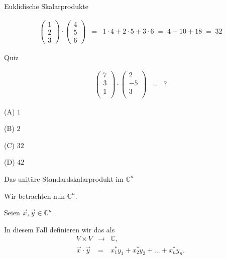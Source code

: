 \documentclass[german]{beamer}
\newcommand{\superalert}[1]{{\color{MyYellowOrange}{#1}}}
\newcommand{\bq}{\begin{eqnarray*}}
\newcommand{\eq}{\end{eqnarray*}}
\begin{document}
\begin{frame}{Euklidische Skalarprodukte}

\begin{example}
\bq
 \left( \begin{array}{c} 1 \\ 2 \\ 3 \end{array} \right)
 \cdot
 \left( \begin{array}{c} 4 \\ 5 \\ 6 \end{array} \right)
 & = &
 1 \cdot 4 + 2 \cdot 5 + 3 \cdot 6
 \; = \;
 4 + 10 + 18 
 \; = \;
 32 
\eq
\end{example}

\end{frame}

\begin{frame}{Quiz}

\bq
 \left( \begin{array}{r} 7 \\ 3 \\ 1 \\ \end{array} \right)
 \cdot
 \left( \begin{array}{r} 2  \\ -5 \\ 3 \\ \end{array} \right)
 & = & ?
\eq
\begin{description}
\item{(A)} $1$
\item{(B)} $2$
\item{(C)} $32$
\item{(D)} $42$
\end{description}

\end{frame}

\begin{frame}{Das unit\"are Standardskalarprodukt im ${\mathbb C}^n$}

Wir betrachten nun \alert{${\mathbb C}^n$}. 

Seien $\vec{x}, \vec{y} \in {\mathbb C}^n$.

In diesem Fall definieren wir das \superalert{unit\"are Standardskalarprodukt} als
\bq
 V \times V & \rightarrow & {\mathbb C},
 \nonumber \\
 \vec{x} \cdot \vec{y} & = & x_1^\ast y_1 + x_2^\ast y_2 + ... + x_n^\ast y_n.
\eq

\end{frame}
\end{document}

